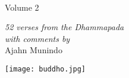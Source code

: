 
\vspace*{1em}

{\centering

\\[0.4\baselineskip]
Volume 2

{\itshape 52 verses from the Dhammapada\\
with comments by}\\[0.4\baselineskip]
Ajahn Munindo

\vfill

\texttt{[image: buddho.jpg]}
\vspace*{1.3em}


}
